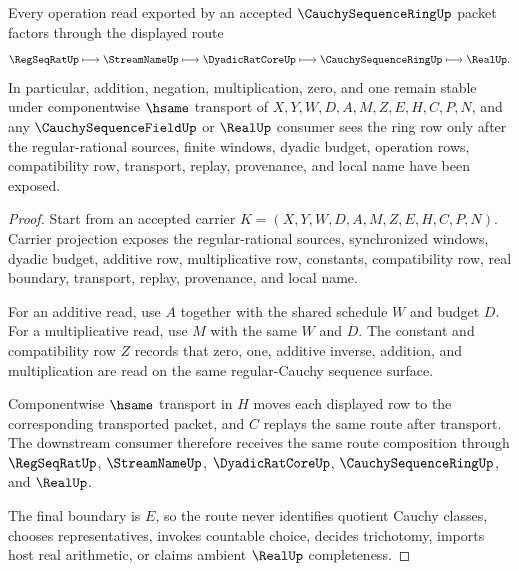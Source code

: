 \begin{theorem}
\label{thm:cauchy-sequence-ring-operation-stability}
Every operation read exported by an accepted $\CauchySequenceRingUp$ packet factors through the displayed route
$$
\RegSeqRatUp \longmapsto \StreamNameUp \longmapsto \DyadicRatCoreUp \longmapsto \CauchySequenceRingUp \longmapsto \RealUp .
$$
In particular, addition, negation, multiplication, zero, and one remain stable under componentwise $\hsame$ transport of $X,Y,W,D,A,M,Z,E,H,C,P,N$, and any $\CauchySequenceFieldUp$ or $\RealUp$ consumer sees the ring row only after the regular-rational sources, finite windows, dyadic budget, operation rows, compatibility row, transport, replay, provenance, and local name have been exposed.
\end{theorem}
\begin{proof}
Start from an accepted carrier $K=(X,Y,W,D,A,M,Z,E,H,C,P,N)$. Carrier projection exposes the regular-rational sources, synchronized windows, dyadic budget, additive row, multiplicative row, constants, compatibility row, real boundary, transport, replay, provenance, and local name.

For an additive read, use $A$ together with the shared schedule $W$ and budget $D$. For a multiplicative read, use $M$ with the same $W$ and $D$. The constant and compatibility row $Z$ records that zero, one, additive inverse, addition, and multiplication are read on the same regular-Cauchy sequence surface.

Componentwise $\hsame$ transport in $H$ moves each displayed row to the corresponding transported packet, and $C$ replays the same route after transport. The downstream consumer therefore receives the same route composition through $\RegSeqRatUp$, $\StreamNameUp$, $\DyadicRatCoreUp$, $\CauchySequenceRingUp$, and $\RealUp$.

The final boundary is $E$, so the route never identifies quotient Cauchy classes, chooses representatives, invokes countable choice, decides trichotomy, imports host real arithmetic, or claims ambient $\RealUp$ completeness.
\end{proof}


